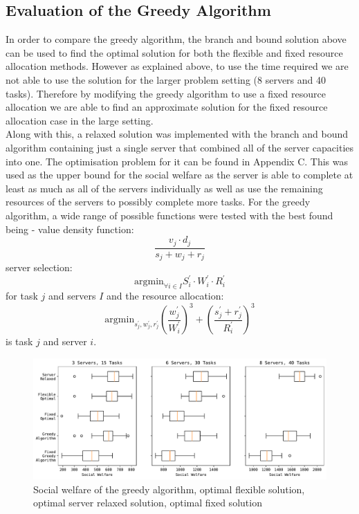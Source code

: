 \subsection{Evaluation of the Greedy Algorithm}
\label{subsec:evaluation-of-the-greedy-algorithm}
In order to compare the greedy algorithm, the branch and bound solution above can be used to find the optimal solution
for both the flexible and fixed resource allocation methods. However as explained above, to use the time required we
are not able to use the solution for the larger problem setting (8 servers and 40 tasks). Therefore by modifying the
greedy algorithm to use a fixed resource allocation we are able to find an approximate solution for the fixed resource
allocation case in the large setting. \\
Along with this, a relaxed solution was implemented with the branch and bound algorithm containing just a single
server that combined all of the server capacities into one. The optimisation problem for it can be found in Appendix C\@.
This was used as the upper bound for the social welfare as the server is able to complete at least as much as all of the
servers individually as well as use the remaining resources of the servers to possibly complete more tasks.
For the greedy algorithm, a wide range of possible functions were tested with the best found being - value density
function: \[\frac{v_j \cdot d_j}{s_j + w_j + r_j}\] server selection:
\[\text{argmin}_{\forall i \in I} S^{'}_i \cdot W^{'}_i \cdot R^{'}_i\] for task $j$ and servers $I$ and the resource allocation:
\[\text{argmin}_{s^{'}_j, w^{'}_j, r^{'}_j} \left(\frac{w^{'}_j}{W^{'}_i}\right)^3 + \left(\frac{s^{'}_j + r^{'}_j}{R^{'}_i}\right)^3\]
is task $j$ and server $i$.

\begin{figure}[h]
    \centering
    \includegraphics[width=\linewidth]{figs/greedy/multi_setting_social_welfare.pdf}
    \caption{Social welfare of the greedy algorithm, optimal flexible solution, optimal server relaxed solution,
             optimal fixed solution}
    \label{fig:greedy-algorithm-comparison}
\end{figure}

